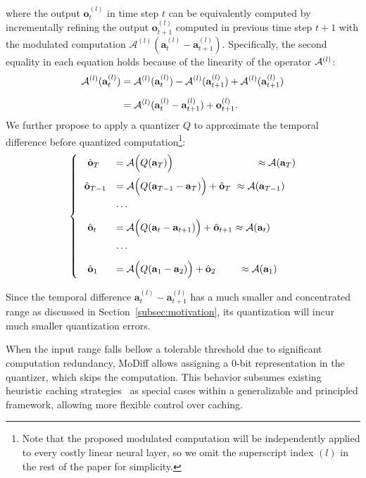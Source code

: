 where the output \(\mathbf{o}_t^{(l)}\) in time step $t$ can be equivalently computed by incrementally refining the output \(\mathbf{o}_{t+1}^{(l)}\) computed in previous time step $t+1$ with the modulated computation \(\mathcal{A}^{(l)}(\mathbf{a}_t^{(l)} - \mathbf{a}_{t+1}^{(l)})\). Specifically, the second equality in each equation holds because of the linearity of the operator ${\mathcal{A}}^{(l)}$: 
\begin{align*}
{\mathcal{A}}^{(l)}({\mathbf{a}}_t^{(l)}) &= {\mathcal{A}}^{(l)}({\mathbf{a}}_t^{(l)}) - {\mathcal{A}}^{(l)}({\mathbf{a}}_{t+1}^{(l)}) + {\mathcal{A}}^{(l)}({\mathbf{a}}_{t+1}^{(l)}) \nonumber \\[6pt]
&= {\mathcal{A}}^{(l)}({\mathbf{a}}_t^{(l)}-{\mathbf{a}}_{t+1}^{(l)})+{\mathbf{o}}_{t+1}^{(l)}. \nonumber
\end{align*}
We further propose to apply a quantizer $Q$ to approximate the temporal difference before quantized computation\footnote{Note that the proposed modulated computation will be independently applied to every costly linear neural layer, so we omit the superscript index $(l)$ in the rest of the paper for simplicity.}:
{\small
\begin{align}
\label{eqn:quantized residual}
\begin{cases}
    ~~~\hat {{\mathbf{o}}}_{T}&= {\mathcal{A}}\Big(Q({\mathbf{a}}_T )\Big)  ~~~~~~~~~~~~~~~~~~~~~~~~~\approx {\mathcal{A}}({\mathbf{a}}_T)  \\[8pt]
    ~~\hat {{\mathbf{o}}}_{T-1}&= {\mathcal{A}} \Big (Q({\mathbf{a}}_{T-1} -{\mathbf{a}}_{T}) \Big)+ \hat {{\mathbf{o}}}_{T}  ~\approx  {\mathcal{A}} ({\mathbf{a}}_{T-1}) \\[6pt]
    & \cdots \\[6pt]
    ~~~\hat {{\mathbf{o}}}_t&= {\mathcal{A}}\Big( Q({\mathbf{a}}_t-{\mathbf{a}}_{t+1}) \Big)+ \hat {{\mathbf{o}}}_{t+1} \approx {\mathcal{A}}({\mathbf{a}}_{t}) \\[6pt]
    & \cdots \\[6pt]
    ~~~\hat {{\mathbf{o}}}_1&= {\mathcal{A}}\Big( Q({\mathbf{a}}_1-{\mathbf{a}}_{2}) \Big)+\hat {{\mathbf{o}}}_{2} ~~~~~~~\approx  {\mathcal{A}}({\mathbf{a}}_{1}) 
\end{cases}
\end{align}}

Since the temporal difference $\mathbf{a}_t^{(l)} - \mathbf{a}_{t+1}^{(l)}$ has a much smaller and concentrated range as discussed in Section~\ref{subsec:motivation}, its quantization will incur much smaller quantization errors.

\begin{remark}
When the input range falls bellow a tolerable threshold due to significant computation redundancy, MoDiff allows assigning a 0-bit representation in the quantizer, which skips the computation. This behavior subsumes existing heuristic caching strategies~\cite{ma2024deepcache} as special cases within a generalizable and principled framework, allowing more flexible control over caching.
\end{remark}

